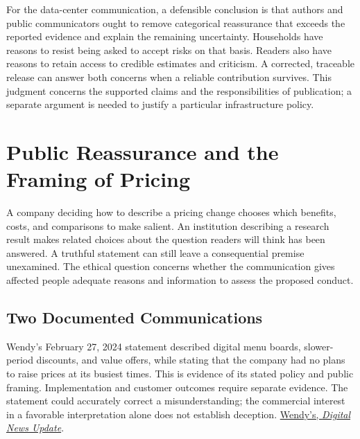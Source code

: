 For the data-center communication, a defensible conclusion is that
authors and public communicators ought to remove categorical reassurance
that exceeds the reported evidence and explain the remaining
uncertainty. Households have reasons to resist being asked to accept
risks on that basis. Readers also have reasons to retain access to
credible estimates and criticism. A corrected, traceable release can
answer both concerns when a reliable contribution survives. This
judgment concerns the supported claims and the responsibilities of
publication; a separate argument is needed to justify a particular
infrastructure policy.


\hypertarget{M09-public-reassurance-and-the-framing-of-pricing}{%
\section{Public Reassurance and the Framing of
Pricing}\label{M09-public-reassurance-and-the-framing-of-pricing}}

\noindent \noindent A company deciding how to describe a pricing change chooses
which benefits, costs, and comparisons to make salient. An institution
describing a research result makes related choices about the question
readers will think has been answered. A truthful statement can still
leave a consequential premise unexamined. The ethical question concerns
whether the communication gives affected people adequate reasons and
information to assess the proposed conduct.

\hypertarget{M09-two-documented-communications}{%
\subsection{Two Documented
Communications}\label{M09-two-documented-communications}}

\noindent \noindent Wendy's February 27, 2024 statement described digital menu
boards, slower-period discounts, and value offers, while stating that
the company had no plans to raise prices at its busiest times. This is
evidence of its stated policy and public framing. Implementation and
customer outcomes require separate evidence. The statement could
accurately correct a misunderstanding; the commercial interest in a
favorable interpretation alone does not establish deception.
\href{https://www.wendys.com/blog/wendys-digital-news-update}{Wendy's,
\emph{Digital News Update}}.

